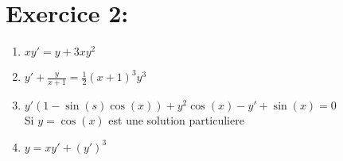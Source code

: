 \documentclass[a4paper,12pt]{article}
\begin{document}
\section*{Exercice 2:}
\begin{enumerate}
	\item $xy\prime = y + 3xy^2$
	\item $y\prime + \frac{y}{x+1} = \frac{1}{2} (x+1)^3 y^3$
	\item $y\prime (1 -\sin(s)\cos(x)) + y^2\cos(x) -y\prime + \sin(x) = 0$ \\ Si $y = \cos(x)$ est une solution particuliere
	\item $y = xy\prime + (y\prime)^3$
\end{enumerate}
\end{document}
